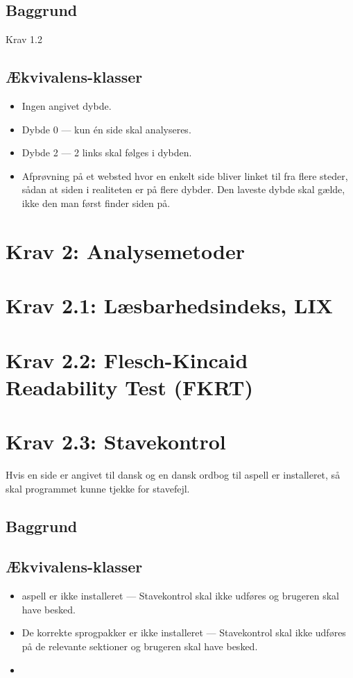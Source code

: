 \documentclass[a4paper,oneside,article, titlepage]{memoir}
\begin{document}
\subsection{Baggrund}
Krav 1.2

\subsection{Ækvivalens-klasser}
\begin{itemize}
\item Ingen angivet dybde.
\item Dybde 0 --- kun én side skal analyseres.
\item Dybde 2 --- 2 links skal følges i dybden.
\item Afprøvning på et websted hvor en enkelt side bliver linket til
  fra flere steder, sådan at siden i realiteten er på flere
  dybder. Den laveste dybde skal gælde, ikke den man først finder
  siden på.
\end{itemize}

\section*{Krav 2: Analysemetoder}

\section*{Krav 2.1: Læsbarhedsindeks, LIX}

\section*{Krav 2.2: Flesch-Kincaid Readability Test (FKRT)}

\section*{Krav 2.3: Stavekontrol}

Hvis en side er angivet til dansk og en dansk ordbog til aspell er
installeret, så skal programmet kunne tjekke for stavefejl.

\subsection{Baggrund}

\subsection{Ækvivalens-klasser}
\begin{itemize}
\item aspell er ikke installeret --- Stavekontrol skal ikke udføres og
  brugeren skal have besked.
\item De korrekte sprogpakker er ikke installeret --- Stavekontrol
  skal ikke udføres på de relevante sektioner og brugeren skal have
  besked.
\item 
\end{itemize}
\end{document}
